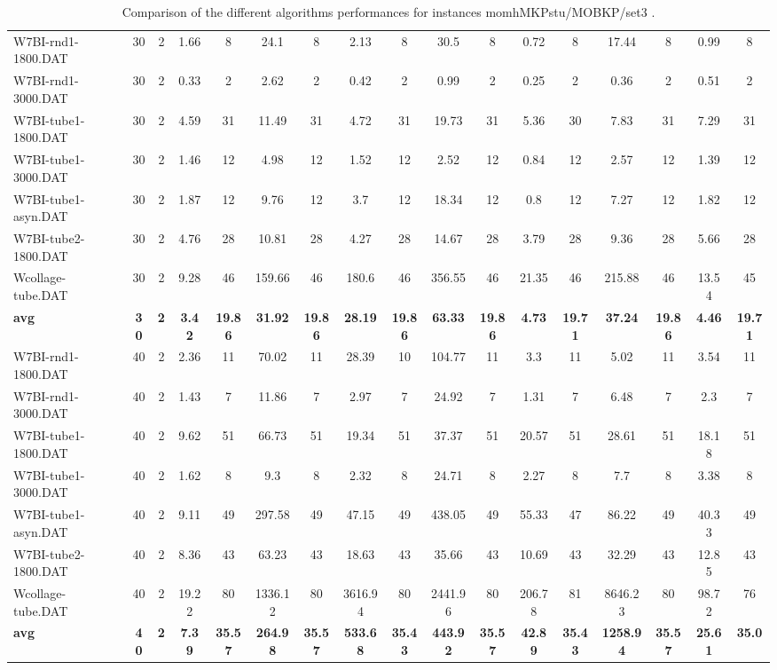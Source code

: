 \begin{table}[!ht]
{\begin{tabular}{lcccccccccccccccc}
W7BI-rnd1-1800.DAT & 30 & 2 & 1.66 & 8 & 24.1 & 8 & 2.13 & 8 & 30.5 & 8 & 0.72 & 8 & 17.44 & 8 & 0.99 & 8 \\
W7BI-rnd1-3000.DAT & 30 & 2 & 0.33 & 2 & 2.62 & 2 & 0.42 & 2 & 0.99 & 2 & 0.25 & 2 & 0.36 & 2 & 0.51 & 2 \\
W7BI-tube1-1800.DAT & 30 & 2 & 4.59 & 31 & 11.49 & 31 & 4.72 & 31 & 19.73 & 31 & 5.36 & 30 & 7.83 & 31 & 7.29 & 31 \\
W7BI-tube1-3000.DAT & 30 & 2 & 1.46 & 12 & 4.98 & 12 & 1.52 & 12 & 2.52 & 12 & 0.84 & 12 & 2.57 & 12 & 1.39 & 12 \\
W7BI-tube1-asyn.DAT & 30 & 2 & 1.87 & 12 & 9.76 & 12 & 3.7 & 12 & 18.34 & 12 & 0.8 & 12 & 7.27 & 12 & 1.82 & 12 \\
W7BI-tube2-1800.DAT & 30 & 2 & 4.76 & 28 & 10.81 & 28 & 4.27 & 28 & 14.67 & 28 & 3.79 & 28 & 9.36 & 28 & 5.66 & 28 \\
Wcollage-tube.DAT & 30 & 2 & 9.28 & 46 & 159.66 & 46 & 180.6 & 46 & 356.55 & 46 & 21.35 & 46 & 215.88 & 46 & 13.54 & 45 \\
\cline{1-17} \textbf{avg} & \textbf{30} & \textbf{2} & \textbf{3.42} & \textbf{19.86} & \textbf{31.92} & \textbf{19.86} & \textbf{28.19} & \textbf{19.86} & \textbf{63.33} & \textbf{19.86} & \textbf{4.73} & \textbf{19.71} & \textbf{37.24} & \textbf{19.86} & \textbf{4.46} & \textbf{19.71} \\ \cline{1-17}
W7BI-rnd1-1800.DAT & 40 & 2 & 2.36 & 11 & 70.02 & 11 & 28.39 & 10 & 104.77 & 11 & 3.3 & 11 & 5.02 & 11 & 3.54 & 11 \\
W7BI-rnd1-3000.DAT & 40 & 2 & 1.43 & 7 & 11.86 & 7 & 2.97 & 7 & 24.92 & 7 & 1.31 & 7 & 6.48 & 7 & 2.3 & 7 \\
W7BI-tube1-1800.DAT & 40 & 2 & 9.62 & 51 & 66.73 & 51 & 19.34 & 51 & 37.37 & 51 & 20.57 & 51 & 28.61 & 51 & 18.18 & 51 \\
W7BI-tube1-3000.DAT & 40 & 2 & 1.62 & 8 & 9.3 & 8 & 2.32 & 8 & 24.71 & 8 & 2.27 & 8 & 7.7 & 8 & 3.38 & 8 \\
W7BI-tube1-asyn.DAT & 40 & 2 & 9.11 & 49 & 297.58 & 49 & 47.15 & 49 & 438.05 & 49 & 55.33 & 47 & 86.22 & 49 & 40.33 & 49 \\
W7BI-tube2-1800.DAT & 40 & 2 & 8.36 & 43 & 63.23 & 43 & 18.63 & 43 & 35.66 & 43 & 10.69 & 43 & 32.29 & 43 & 12.85 & 43 \\
Wcollage-tube.DAT & 40 & 2 & 19.22 & 80 & 1336.12 & 80 & 3616.94 & 80 & 2441.96 & 80 & 206.78 & 81 & 8646.23 & 80 & 98.72 & 76 \\
\cline{1-17} \textbf{avg} & \textbf{40} & \textbf{2} & \textbf{7.39} & \textbf{35.57} & \textbf{264.98} & \textbf{35.57} & \textbf{533.68} & \textbf{35.43} & \textbf{443.92} & \textbf{35.57} & \textbf{42.89} & \textbf{35.43} & \textbf{1258.94} & \textbf{35.57} & \textbf{25.61} & \textbf{35.0} \\ \cline{1-17}
\bottomrule
\end{tabular}
}%
\caption{Comparison of the different algorithms performances for instances momhMKPstu/MOBKP/set3 .}
\label{tab:table_compare_momhMKPstu/MOBKP/set3 }
\end{table}
